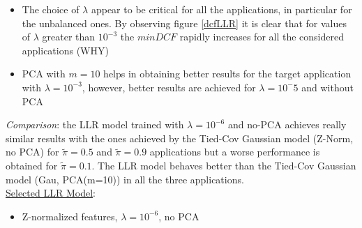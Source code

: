 \documentclass[10pt, a4paper, twocolumn]{article} %
\begin{document}
\begin{itemize}
	\item The choice of $\lambda$ appear to be critical for all the applications, in particular for the 
	unbalanced ones. By observing figure \ref{dcfLLR} it is clear that for values of $\lambda$ greater
	than $10^{-3}$ the $minDCF$ rapidly increases for all the considered applications (WHY)
	\item PCA with $m=10$ helps in obtaining better
	results for the target application with $\lambda=10^{-3}$, however, better results are achieved for $\lambda=10^-5$
	and without PCA
\end{itemize}
\textit{Comparison}: the LLR model trained with $\lambda=10^{-6}$ and no-PCA achieves really similar results
with the ones achieved by the Tied-Cov Gaussian model (Z-Norm, no PCA) for $\tilde{\pi}=0.5$ and $\tilde{\pi}=0.9$
applications but a worse performance is obtained for $\tilde{\pi}=0.1$. The LLR model behaves better than the
Tied-Cov Gaussian model (Gau, PCA(m=10)) in all the three applications.\\
\underline{Selected LLR Model}: 
\begin{itemize}
	\item Z-normalized features, $\lambda=10^{-6}$, no PCA
\end{itemize}
\end{document}
